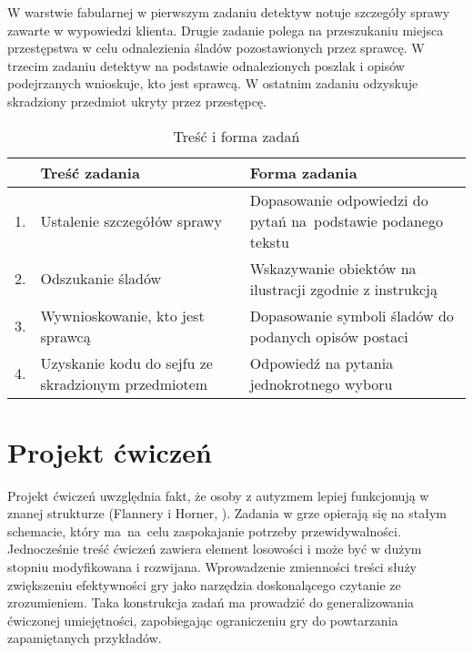     W warstwie fabularnej w pierwszym zadaniu detektyw notuje szczegóły sprawy zawarte w wypowiedzi klienta.
    Drugie zadanie polega na przeszukaniu miejsca przestępstwa w celu odnalezienia śladów pozostawionych przez sprawcę.
    W trzecim zadaniu detektyw na podstawie odnalezionych poszlak i opisów podejrzanych wnioskuje, kto jest sprawcą.
    W ostatnim zadaniu odzyskuje skradziony przedmiot ukryty przez przestępcę.
    
    \begin{table}
        \begin{tabularx}{\textwidth}{ l X X }
         \hline
         
         \hline
          & \textbf{Treść zadania} & \textbf{Forma zadania} \\
          \hline
         1. & Ustalenie szczegółów sprawy & Dopasowanie odpowiedzi do pytań na~podstawie podanego tekstu \\
         2. & Odszukanie śladów & Wskazywanie obiektów na ilustracji zgodnie z instrukcją \\
         3. & Wywnioskowanie, kto jest sprawcą & Dopasowanie symboli śladów do podanych opisów postaci \\
         4. & Uzyskanie kodu do sejfu ze skradzionym przedmiotem & Odpowiedź na pytania jednokrotnego wyboru \\
         \hline
         
         \hline
        \end{tabularx}
        \caption{Treść i forma zadań}
        \label{table:zadania}
    \end{table}

\section{Projekt ćwiczeń}

    Projekt ćwiczeń uwzględnia fakt, że osoby z autyzmem lepiej funkcjonują w znanej strukturze (Flannery i Horner, \cite*{flannery1994relationship}).
    Zadania w grze opierają się na stałym schemacie, który ma~na~celu zaspokajanie potrzeby przewidywalności.
    Jednocześnie treść ćwiczeń zawiera element losowości i może być w dużym stopniu modyfikowana i rozwijana.
    Wprowadzenie zmienności treści służy zwiększeniu efektywności gry jako narzędzia doskonalącego czytanie ze zrozumieniem.
    Taka konstrukcja zadań ma prowadzić do generalizowania ćwiczonej umiejętności, zapobiegając ograniczeniu gry do powtarzania zapamiętanych przykładów.
    
